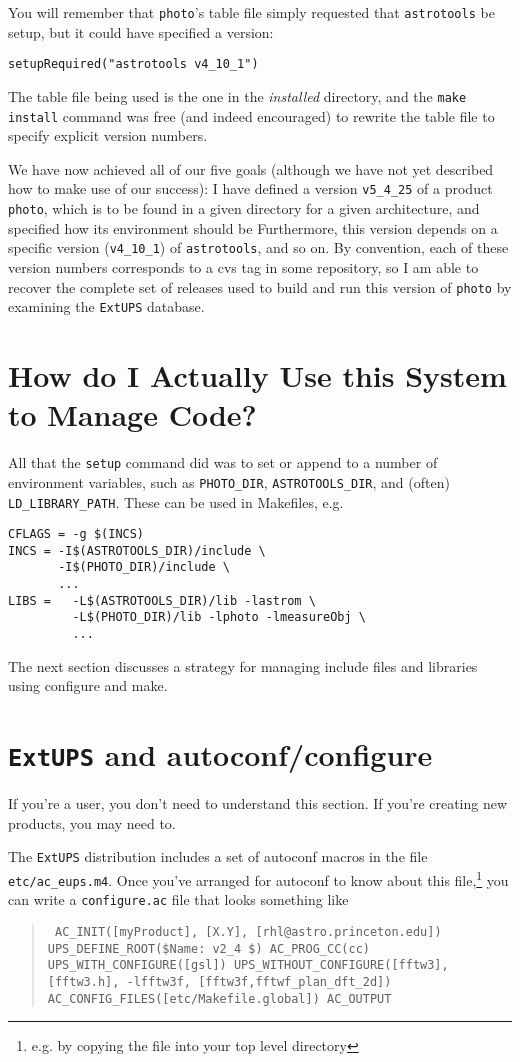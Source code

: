 \documentclass{article}
\newcommand{\code}[1]{\texttt{#1}}
\newcommand{\file}[1]{\texttt{#1}}
\newcommand{\eups}{\code{ExtUPS}}
\begin{document}
You will remember that \code{photo}'s table file simply requested
that \code{astrotools} be setup, but it could have specified a version:
\begin{verbatim}
setupRequired("astrotools v4_10_1")
\end{verbatim}
The table file being used is the one in the \emph{installed} directory,
and the \code{make install} command was free (and indeed encouraged) to
rewrite the table file to specify explicit version numbers.

We have now achieved all of our five goals (although we have not
yet described how to make use of our success): I have defined
a version \code{v5\_4\_25} of a product \code{photo}, which is
to be found in a given directory for a given architecture,
and specified how its environment should be Furthermore,
this version depends on a specific version (\code{v4\_10\_1}) of
\code{astrotools}, and so on. By convention, each of these version
numbers corresponds to a cvs tag in some repository, so I am
able to recover the complete set of releases used to build and
run this version of \code{photo} by examining the \eups{} database.

\section{How do I Actually Use this System to Manage Code?}

All that the \code{setup} command did was to set or append to a number of environment variables,
such as \code{PHOTO\_DIR}, \code{ASTROTOOLS\_DIR}, and (often) \code{LD\_LIBRARY\_PATH}.
These can be used in Makefiles, e.g.
\begin{verbatim}
CFLAGS = -g $(INCS)
INCS = -I$(ASTROTOOLS_DIR)/include \
       -I$(PHOTO_DIR)/include \
       ...
LIBS =   -L$(ASTROTOOLS_DIR)/lib -lastrom \
         -L$(PHOTO_DIR)/lib -lphoto -lmeasureObj \
         ...
\end{verbatim} %

The next section discusses a strategy for managing include files
and libraries using configure and make.

\section{\eups{} and autoconf/configure}

If you're a user, you don't need to understand this section. If
you're creating new products, you may need to.

The \eups{} distribution includes a set of autoconf macros
in the file \file{etc/ac\_eups.m4}. Once you've arranged for
autoconf to know about this file,\footnote{e.g. by copying the
  file into your top level directory} you can write a
\file{configure.ac} file that looks something like
\begin{quote}
\obeylines\tt\small\parskip=0pt
AC\_INIT([myProduct], [X.Y], [rhl@astro.princeton.edu])
UPS\_DEFINE\_ROOT(\${Name}: v2\_4 \$)
AC\_PROG\_CC(cc)
UPS\_WITH\_CONFIGURE([gsl])
UPS\_WITHOUT\_CONFIGURE([fftw3], [fftw3.h], -lfftw3f, [fftw3f,fftwf\_plan\_dft\_2d])
AC\_CONFIG\_FILES([etc/Makefile.global])
AC\_OUTPUT
\end{quote}
\end{document}
